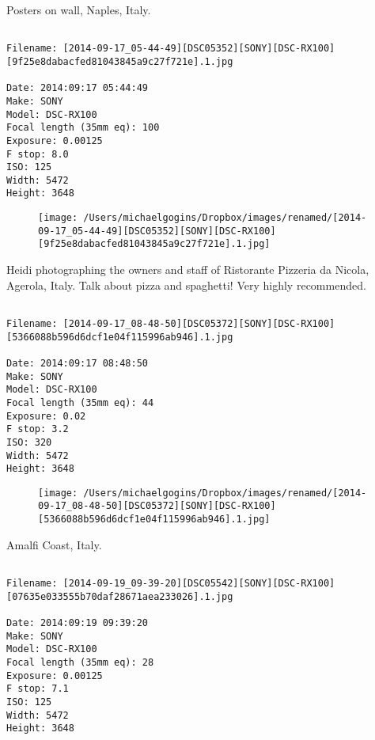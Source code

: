 \clearpage
\onecolumn
\noindent Posters on wall, Naples, Italy.
\noindent
\begin{lstlisting}

Filename: [2014-09-17_05-44-49][DSC05352][SONY][DSC-RX100][9f25e8dabacfed81043845a9c27f721e].1.jpg

Date: 2014:09:17 05:44:49
Make: SONY
Model: DSC-RX100
Focal length (35mm eq): 100
Exposure: 0.00125
F stop: 8.0
ISO: 125
Width: 5472
Height: 3648
\end{lstlisting}
\clearpage

\begin{figure}
\texttt{[image: /Users/michaelgogins/Dropbox/images/renamed/[2014-09-17\_05-44-49][DSC05352][SONY][DSC-RX100][9f25e8dabacfed81043845a9c27f721e].1.jpg]}
\end{figure}
    
\clearpage
\onecolumn
\noindent Heidi photographing the owners and staff of Ristorante Pizzeria da Nicola, Agerola, Italy. Talk about pizza and spaghetti! Very highly recommended.
\noindent
\begin{lstlisting}

Filename: [2014-09-17_08-48-50][DSC05372][SONY][DSC-RX100][5366088b596d6dcf1e04f115996ab946].1.jpg

Date: 2014:09:17 08:48:50
Make: SONY
Model: DSC-RX100
Focal length (35mm eq): 44
Exposure: 0.02
F stop: 3.2
ISO: 320
Width: 5472
Height: 3648
\end{lstlisting}
\clearpage

\begin{figure}
\texttt{[image: /Users/michaelgogins/Dropbox/images/renamed/[2014-09-17\_08-48-50][DSC05372][SONY][DSC-RX100][5366088b596d6dcf1e04f115996ab946].1.jpg]}
\end{figure}
    
\clearpage
\onecolumn
\noindent Amalfi Coast, Italy.
\noindent
\begin{lstlisting}

Filename: [2014-09-19_09-39-20][DSC05542][SONY][DSC-RX100][07635e033555b70daf28671aea233026].1.jpg

Date: 2014:09:19 09:39:20
Make: SONY
Model: DSC-RX100
Focal length (35mm eq): 28
Exposure: 0.00125
F stop: 7.1
ISO: 125
Width: 5472
Height: 3648
\end{lstlisting}
\clearpage

